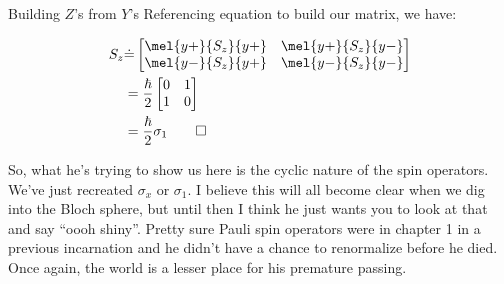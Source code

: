 \begin{answer}
\begin{answerpart}{\texorpdfstring{Building $Z$'s from $Y$'s}{Building Z's from Y's}}
    Referencing equation  to build
    our matrix, we have:

    \begin{equation}
      \begin{split}
        S_z
        &\dot{=}
        \begin{bmatrix}
          \mel{y+}{S_z}{y+} & \mel{y+}{S_z}{y-}\\
          \mel{y-}{S_z}{y+} & \mel{y-}{S_z}{y-}\\
        \end{bmatrix}
        \\
        &=
        \frac{\hbar}{2}
        \begin{bmatrix}
          0 & 1\\
          1 & 0\\
        \end{bmatrix}
        \\
        &=
        \frac{\hbar}{2}\sigma_1\qed
      \end{split}
    \end{equation}

    So, what he's trying to show us here is the cyclic nature of the
    spin operators.  We've just recreated $\sigma_x$ or $\sigma_1$.  I
    believe this will all become clear when we dig into the Bloch
    sphere, but until then I think he just wants you to look at that
    and say ``oooh shiny''.  Pretty sure Pauli spin operators were in
    chapter 1 in a previous incarnation and he didn't have a chance to
    renormalize before he died.  Once again, the world is a lesser
    place for his premature passing.

  \end{answerpart}

\end{answer}
